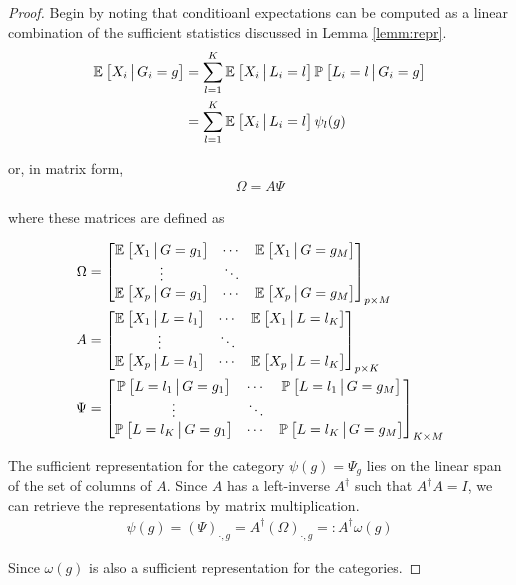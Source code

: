 \documentclass{article}
\theoremstyle{plain}
\theoremstyle{definition}
\theoremstyle{remark}
\begin{document}
\begin{proof}
\label{proof:means}
Begin by noting that conditioanl expectations can be computed as a linear combination of the sufficient statistics discussed in Lemma \ref{lemm:repr}.
\begin{align}
    \mathbb{E}_{}\left[ X_{i} \,\big|\, G_{i} = g\right]
    &= \sum_{l=1}^{K} \mathbb{E}_{}\left[X_{i} \,\big|\, L_{i} = l\right] \mathbb{P}_{}\left[L_{i} = l \,\big|\, G_{i} = g\right] \\
    &= \sum_{l=1}^{K} \mathbb{E}_{}\left[X_{i} \,\big|\, L_{i} = l\right] \psi_{l}(g)
    \label{eq:scalar_decomposition}
\end{align}

\noindent or, in matrix form,
\begin{align}
    \Omega = A\Psi
    \label{eq:matrix_decomposition}
\end{align}

\noindent where these matrices are defined as

\begin{align}
    \Omega &=
    \begin{bmatrix}
        \mathbb{E}_{}\left[X_{1} \,\big|\, G=g_{1}\right] & \cdots & \mathbb{E}_{}\left[X_{1} \,\big|\, G=g_{M}\right] \\
                \vdots     &  \ddots &  \\
        \mathbb{E}_{}\left[X_{p} \,\big|\, G=g_{1}\right] & \cdots & \mathbb{E}_{}\left[X_{p} \,\big|\, G=g_{M}\right] \\
    \end{bmatrix}_{p\times M}
    \label{eq:matrix_omega}
\\
    A &=
    \begin{bmatrix}
        \mathbb{E}_{}\left[X_{1} \,\big|\, L=l_{1}\right] & \cdots & \mathbb{E}_{}\left[X_{1} \,\big|\, L=l_{K}\right] \\
                \vdots     &  \ddots &  \\
        \mathbb{E}_{}\left[X_{p} \,\big|\, L=l_{1}\right] & \cdots & \mathbb{E}_{}\left[X_{p} \,\big|\, L=l_{K}\right] \\
    \end{bmatrix}_{p\times K}
    \label{eq:matrix_a}
\\
    \Psi &=
    \begin{bmatrix}
        \mathbb{P}_{}\left[L = l_{1} \,\big|\, G=g_{1}\right] & \cdots & \mathbb{P}_{}\left[L = l_{1} \,\big|\, G=g_{M}\right] \\
                \vdots     &  \ddots &  \\
        \mathbb{P}_{}\left[L = l_{K} \,\big|\, G=g_{1}\right] & \cdots & \mathbb{P}_{}\left[ L = l_{K} \,\big|\, G=g_{M}\right] \\
    \end{bmatrix}_{K\times M}
    \label{eq:matrix_psi}
\end{align}

The sufficient representation for the category $\psi(g) = \Psi_{g}$ lies on the linear span of the set of columns of $A$. Since $A$ has a left-inverse $A^\dagger$ such that $A^\dagger A = I$, we can retrieve the representations by matrix multiplication.
\begin{align}
    \psi(g) = (\Psi)_{\cdot, g} = A^\dagger(\Omega)_{\cdot, g} =: A^\dagger \omega(g)
    \label{eq:omega_inverse}
\end{align}

Since $\omega(g)$ is also a sufficient representation for the categories.
\end{proof}
\end{document}
